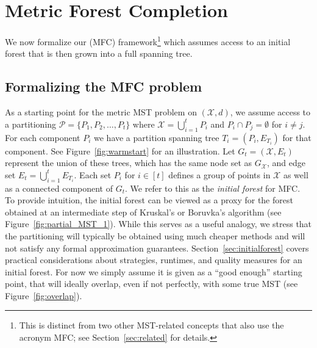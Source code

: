 \section{Metric Forest Completion}
\label{sec:mfc}
We now formalize our \mfc{} (MFC) framework\footnote{This is distinct from two other MST-related concepts that also use the acronym MFC; see Section~\ref{sec:related} for details.}
which assumes access to an initial forest that is then grown into a full spanning tree.

 \subsection{Formalizing the MFC problem}
\label{sec:definemfc}
As a starting point for the metric MST problem on $(\mathcal{X},d)$, we assume access to a partitioning $\mathcal{P} = \{P_1, P_2, \hdots , P_t\}$ where $\mathcal{X} = \bigcup_{i = 1}^t P_i$ and $P_i \cap P_j = \emptyset$ for $i \neq j$. For each component $P_i$ we have a partition spanning tree $T_i = (P_i, E_{T_i})$ for that component.
See Figure~\ref{fig:warmstart} for an illustration. Let $G_t = (\mathcal{X}, E_t)$ represent the union of these trees, which has the same node set as $G_\mathcal{X}$, and edge set $E_t = \bigcup_{i = 1}^t E_{T_i}$. Each set $P_i$ for $i \in [t]$ defines a group of points in $\mathcal{X}$ as well as a connected component of $G_t$. We refer to this as the \emph{initial forest} for MFC. To provide intuition, the initial forest can be viewed as a proxy for the forest obtained at an intermediate step of Kruskal's or Boruvka's algorithm (see Figure~\ref{fig:partial_MST_1}). While this serves as a useful analogy, we stress that the partitioning will typically be obtained using much cheaper methods and will not satisfy any formal approximation guarantees. Section~\ref{sec:initialforest} covers practical considerations about strategies, runtimes, and quality measures for an initial forest. For now we simply assume it is given as a ``good enough'' starting point, that will ideally overlap, even if not perfectly, with some true MST (see Figure~\ref{fig:overlap}). 

